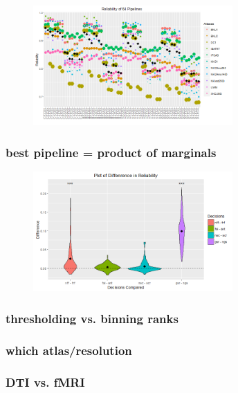 \documentclass{article}
\begin{document}
\begin{figure}[t!]
\includegraphics[width=3.0in]{../Figs/64_pipelines_gg.png}
\caption{}
\label{fig:64}
\end{figure}


\subsubsection{best pipeline = product of marginals}


\begin{figure}[t!]
\includegraphics[width=3.0in]{../Figs/Differ_violin_mean.png}
\caption{}
\label{fig:64}
\end{figure}



\subsubsection{thresholding vs. binning ranks}

\subsubsection{which atlas/resolution}


\subsubsection{DTI vs. fMRI}
\end{document}
